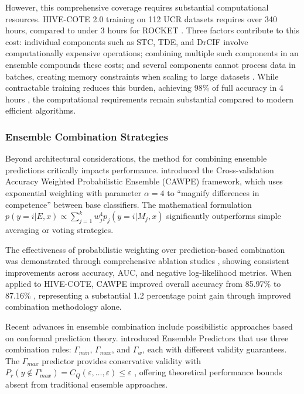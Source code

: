\documentclass[pdflatex,sn-basic]{sn-jnl}           %
\theoremstyle{thmstyleone}%
\theoremstyle{thmstyletwo}%
\theoremstyle{thmstylethree}%
\begin{document}
However, this comprehensive coverage requires substantial computational resources. HIVE-COTE 2.0 training on 112 UCR datasets requires over 340 hours, compared to under 3 hours for ROCKET \citep[Table~4, p.~3228-3229]{hive-cote-2}. Three factors contribute to this cost: individual components such as STC, TDE, and DrCIF involve computationally expensive operations; combining multiple such components in an ensemble compounds these costs; and several components cannot process data in batches, creating memory constraints when scaling to large datasets \citep[p.~3239]{hive-cote-2}. While contractable training reduces this burden, achieving 98\% of full accuracy in 4 hours \citep[p.~3237]{hive-cote-2}, the computational requirements remain substantial compared to modern efficient algorithms.

\subsubsection{Ensemble Combination Strategies}

Beyond architectural considerations, the method for combining ensemble predictions critically impacts performance. \citet[p.~3]{cawpe} introduced the Cross-validation Accuracy Weighted Probabilistic Ensemble (CAWPE) framework, which uses exponential weighting with parameter $\alpha=4$ to ``magnify differences in competence'' between base classifiers. The mathematical formulation $p(y=i|E,x) \propto \sum_{j=1}^k w_j^4 p_j(y=i|M_j,x)$ \citep[p.~8, Equation~1]{cawpe} significantly outperforms simple averaging or voting strategies.

The effectiveness of probabilistic weighting over prediction-based combination was demonstrated through comprehensive ablation studies \citep[p.~22, Figure~12]{cawpe}, showing consistent improvements across accuracy, AUC, and negative log-likelihood metrics. When applied to HIVE-COTE, CAWPE improved overall accuracy from 85.97\% to 87.16\% \citep[p.~19]{cawpe}, representing a substantial 1.2 percentage point gain through improved combination methodology alone.

Recent advances in ensemble combination include possibilistic approaches based on conformal prediction theory. \citet[p.~4]{ensemble-predictors} introduced Ensemble Predictors that use three combination rules: $\Gamma_{min}$, $\Gamma_{max}$, and $\Gamma_w$, each with different validity guarantees. The $\Gamma_{max}$ predictor provides conservative validity with $P_r(y \notin \Gamma_{max}^{\varepsilon}) = C_Q(\varepsilon,\ldots,\varepsilon) \leq \varepsilon$ \citep[Theorem~4, p.~5]{ensemble-predictors}, offering theoretical performance bounds absent from traditional ensemble approaches.
\end{document}
